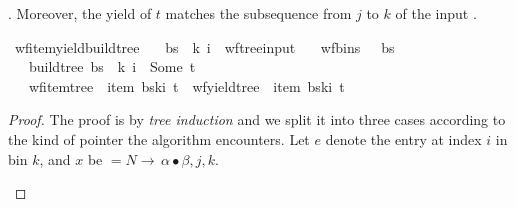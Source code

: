 \begin{isabellebody}
\begin{isamarkuptext}
\isa{{\isasymalpha}}. Moreover, the yield of $t$ matches the subsequence from $j$ to $k$ of the input \isa{{\isasymomega}}.%
\end{isamarkuptext}\isamarkuptrue%
\isamarkupfalse%
\ wf{\isacharunderscore}{\kern0pt}item{\isacharunderscore}{\kern0pt}yield{\isacharunderscore}{\kern0pt}build{\isacharunderscore}{\kern0pt}tree{\isacharprime}{\kern0pt}{\isacharcolon}{\kern0pt}\isanewline
\ \ \ {\isachardoublequoteopen}{\isacharparenleft}{\kern0pt}bs{\isacharcomma}{\kern0pt}\ {\isasymomega}{\isacharcomma}{\kern0pt}\ k{\isacharcomma}{\kern0pt}\ i{\isacharparenright}{\kern0pt}\ {\isasymin}\ wf{\isacharunderscore}{\kern0pt}tree{\isacharunderscore}{\kern0pt}input{\isachardoublequoteclose}\isanewline
\ \ \ {\isachardoublequoteopen}wf{\isacharunderscore}{\kern0pt}bins\ {\isasymG}\ {\isasymomega}\ bs{\isachardoublequoteclose}\isanewline
\ \ \ {\isachardoublequoteopen}build{\isacharunderscore}{\kern0pt}tree{\isacharprime}{\kern0pt}\ bs\ {\isasymomega}\ k\ i\ {\isacharequal}{\kern0pt}\ Some\ t{\isachardoublequoteclose}\isanewline
\ \ \ {\isachardoublequoteopen}wf{\isacharunderscore}{\kern0pt}item{\isacharunderscore}{\kern0pt}tree\ {\isasymG}\ {\isacharparenleft}{\kern0pt}item\ {\isacharparenleft}{\kern0pt}bs{\isacharbang}{\kern0pt}k{\isacharbang}{\kern0pt}i{\isacharparenright}{\kern0pt}{\isacharparenright}{\kern0pt}\ t\ {\isasymand}\ wf{\isacharunderscore}{\kern0pt}yield{\isacharunderscore}{\kern0pt}tree\ {\isasymomega}\ {\isacharparenleft}{\kern0pt}item\ {\isacharparenleft}{\kern0pt}bs{\isacharbang}{\kern0pt}k{\isacharbang}{\kern0pt}i{\isacharparenright}{\kern0pt}{\isacharparenright}{\kern0pt}\ t{\isachardoublequoteclose}%
\isadelimproof
%
\endisadelimproof
%
\isatagproof
%
\endisatagproof
{\isafoldproof}%
%
\isadelimproof
%
\endisadelimproof
%
\begin{isamarkuptext}%
\begin{proof}

The proof is by \textit{tree induction} and we split it into three cases according to the kind
of pointer the algorithm encounters. Let $e$ denote the entry at index $i$ in bin $k$, and $x$
be  $= N \rightarrow \, \alpha \bullet \beta, j, k$.

\begin{itemize}


\end{itemize}
\end{proof}
\end{isamarkuptext}
\end{isabellebody}
